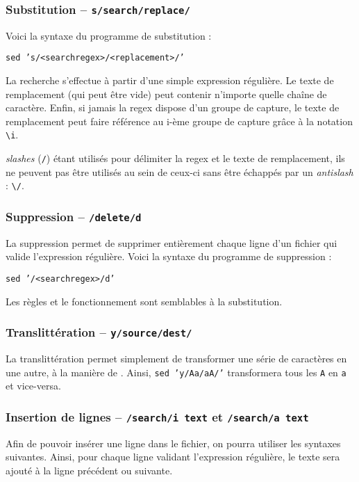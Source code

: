 \subsubsection{Substitution -- \texttt{s/search/replace/}}

Voici la syntaxe du programme de substitution :
\begin{nscenter}
\texttt{sed 's/<searchregex>/<replacement>/'}
\end{nscenter}

La recherche s'effectue à partir d'une simple expression régulière. Le texte de remplacement (qui peut être vide) peut contenir n'importe quelle chaîne de caractère. Enfin, si jamais la regex dispose d'un groupe de capture, le texte de remplacement peut faire référence au i-ème groupe de capture grâce à la notation \texttt{\textbackslash i}.

 \textit{slashes} (\texttt{/}) étant utilisés pour délimiter la regex et le texte de remplacement, ils ne peuvent pas être utilisés au sein de ceux-ci sans être échappés par un \textit{antislash} : \texttt{\textbackslash /}.

\subsubsection{Suppression -- \texttt{/delete/d}}
La suppression permet de supprimer entièrement chaque ligne d'un fichier qui valide l'expression régulière. Voici la syntaxe du programme de suppression :
\begin{nscenter}
\texttt{sed '/<searchregex>/d'}
\end{nscenter}

Les règles et le fonctionnement sont semblables à la substitution.

\subsubsection{Translittération -- \texttt{y/source/dest/}}
La translittération permet simplement de transformer une série de caractères en une autre, à la manière de .
Ainsi, \texttt{sed 'y/Aa/aA/'} transformera tous les \texttt{A} en \texttt{a} et vice-versa.

\subsubsection{Insertion de lignes -- \texttt{/search/i text} et \texttt{/search/a text}}
Afin de pouvoir insérer une ligne dans le fichier, on pourra utiliser les syntaxes suivantes. Ainsi, pour chaque ligne validant l'expression régulière, le texte sera ajouté à la ligne précédent ou suivante.

